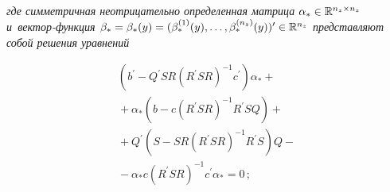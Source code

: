 \begin{multicols}{2}
     \vspace*{-4pt}
     
     \noindent
\textit{где симметричная неотрицательно определенная мат\-ри\-ца 
$\alpha_*\hm\in \mathbb{R}^{n_z\times n_z}$ и~век\-тор-функ\-ция 
$\beta_*\hm=\beta_*(y)\hm= (\beta_*^{(1)}(y),\ldots , \beta_*^{(n_z)}(y))^\prime\hm\in 
\mathbb{R}^{n_z}$ пред\-став\-ля\-ют собой решения уравнений}

\noindent
\begin{multline}
\left( b^\prime -Q^\prime SR (R^\prime SR)^{-1} c^\prime\right) \alpha_* 
+{}\\[2pt]
{}+\alpha_* \left(b-c(R^\prime SR)^{-1} R^\prime SQ\right)+{}\\[2pt]
{}+
Q^\prime \left(S-SR(R^\prime SR)^{-1} R^\prime S\right)Q -{}\\[2pt]
{}- \alpha_* c\left(R^\prime SR\right)^{-1} 
c^\prime \alpha_*=0\,;
\label{e6-bos}
\end{multline}

\vspace*{-12pt}


\end{multicols}
